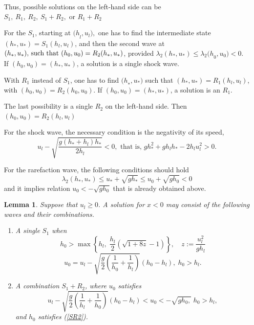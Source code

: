 \documentclass{article}
\theoremstyle{plain}
\newtheorem{lemma}{Lemma}[section]
\theoremstyle{definition}
\theoremstyle{remark}
\begin{document}
Thus, possible solutions on the left-hand side can be
\(S_{1},\ R_{1},\ R_{2},\ S_{1} + R_{2}, \text{ or } R_{1} + R_{2}\)

For the $S_1$, starting at
\({(h}_{l},u_{l}),\) one has to find the intermediate state
\((h_{\ast},u_{\ast}) = S_{1}(h_{l},u_{l})\),
and then the second wave  at 
\((h_{\ast},u_{\ast}),$ such that  $(h_{0},u_{0}) = R_{2}(h_{\ast},u_{\ast})\), provided 
\(\lambda_{2}(h_{\ast},u_{\ast}) \leq \lambda_{2}{(h}_{0},u_{0}) < 0\).
If \( (h_{0},u_{0}) = (h_{\ast},u_{\ast}) \),  a solution is a single shock wave.

With \(R_{1}\) instead of \(S_{1}\), one has to
find  \({(h}_{\ast},u_{\ast})\) such that
\((h_{\ast},u_{\ast}) = R_{1}(h_{l},u_{l})\), with
\((h_{0},u_{0}) = R_{2}(h_{0},u_{0})\). If \( (h_{0},u_{0}) 
= (h_{\ast},u_{\ast}) \), a solution is an $R_{1}$.

The last possibility is a single $R_{2}$ on the left-hand side. Then 
\( (h_{0},u_{0}) = R_{2}(h_{l},u_{l})\)

For the shock wave, the necessary condition is the negativity of its speed,
\[
u_{l} - \sqrt{\frac{g\left( h_{\ast} + h_{l} \right)h_{\ast}}{2h_{l}}} < 0, 
\text{ that is, }
gh_{\ast}^{2} + gh_{l}h_{\ast} - 2h_{l}u_{l}^{2} > 0.
\]

For the rarefaction wave, the following conditions should hold
\[\lambda_{2}(h_{\ast},u_{\ast}) \leq u_{\ast} + \sqrt{gh_{\ast}} \leq u_{0} + \sqrt{gh_{0}} < 0\]
and it implies relation $u_{0}<-\sqrt{gh_{0}}$ that is already obtained
above. 

\begin{lemma} \label{lemma2}
Suppose that $u_{l}\geq 0$. A solution for $x<0$ may consist of
the following waves and their combinations.
\begin{enumerate}
\item A single $S_{1}$ when
\begin{equation} \label{SR2}
h_{0} > \max \left\{ h_{l}, \; \frac{h_l}{2}\left( \sqrt{1 + 8z} - 1 \right)\right\},
\quad z:=\frac{u_l^2}{gh_l}
\end{equation}
\begin{equation} \label{S}
u_{0} = u_{l} - \sqrt{\frac{g}{2} \left( \frac{1}{h_{0}} + \frac{1}{h_{l}} \right)}
\left( h_{0} - h_{l} \right), \; h_{0} > h_{l}.
\end{equation}
\item A combination $S_{1}+R_{2}$, where $u_{0}$ satisfies
\begin{equation} \label{SR}
u_{l} - \sqrt{\frac{g}{2}\left( \frac{1}{h_{l}} + \frac{1}{h_{0}} \right)}
\left( h_{0} - h_{l} \right) < u_{0} 
< -\sqrt{gh_{0},}\;  h_{0} > h_{l},
\end{equation}
and $h_{0}$ satisfies (\ref{SR2}).
\end{enumerate}
\end{lemma}
\end{document}
